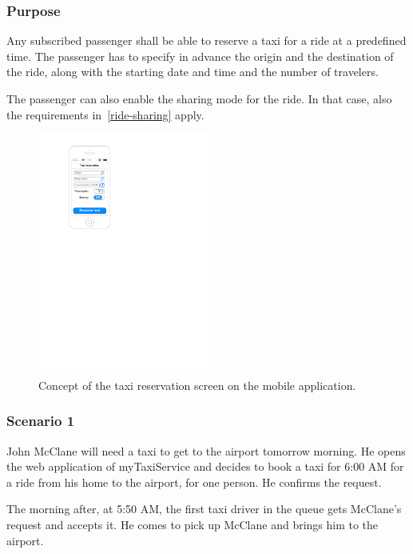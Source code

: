 \label{taxi-reservation}
\subsubsection{Purpose}

Any subscribed passenger shall be able to reserve a taxi for a ride at a predefined time. The passenger has to specify in advance the origin and the destination of the ride, along with the starting date and time and the number of travelers.

The passenger can also enable the sharing mode for the ride.
In that case, also the requirements in~\autoref{ride-sharing} apply.

\begin{figure}
	\begin{center}
	\includegraphics[width=0.5\textwidth]{mockup/TaxiReservation.pdf}
	\caption{Concept of the taxi reservation screen on the mobile application.}
	\label{fig:mockup-reservation}
	\end{center}
\end{figure}

\subsubsection{Scenario 1}
John McClane will need a taxi to get to the airport tomorrow morning. He opens the web application of myTaxiService and decides to book a taxi for 6:00 AM for a ride from his home to the airport, for one person. He confirms the request.

The morning after, at 5:50 AM, the first taxi driver in the queue gets McClane's request and accepts it. He comes to pick up McClane and brings him to the airport.

